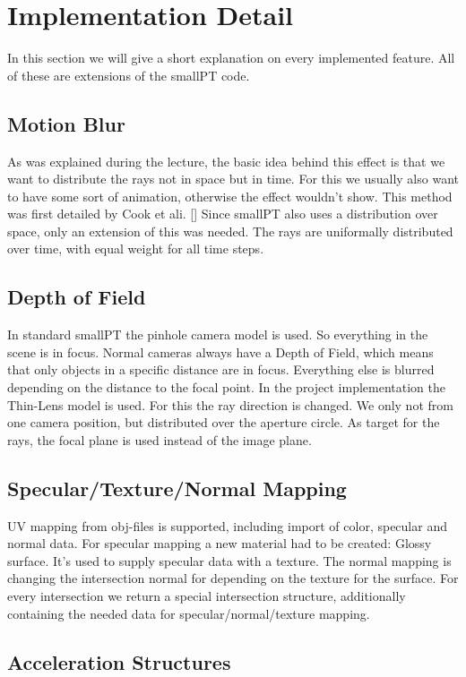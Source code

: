 \documentclass[11pt,a4paper]{article}
\begin{document}
\section{Implementation Detail}
In this section we will give a short explanation on every implemented feature. All of these are extensions of the smallPT code. 

\subsection{Motion Blur}
As was explained during the lecture, the basic idea behind this effect is that we want to distribute the rays not in space but in time. For this we usually also want to have some sort of animation, otherwise the effect wouldn't show. This method was first detailed by Cook et ali. [] 
Since smallPT also uses a distribution over space, only an extension of this was needed.
The rays are uniformally distributed over time, with equal weight for all time steps. 

\subsection{Depth of Field}
In standard smallPT the pinhole camera model is used. So everything in the scene is in focus. Normal cameras always have a Depth of Field, which means that only objects in a specific distance are in focus. Everything else is blurred depending on the distance to the focal point. In the project implementation the Thin-Lens model is used. For this the ray direction is changed. We only not from one camera position, but distributed over the aperture circle. As target for the rays, the focal plane is used instead of the image plane. 


\subsection{Specular/Texture/Normal Mapping}

UV mapping from obj-files is supported, including import of color, specular and normal data.
For specular mapping a new material had to be created: Glossy surface. It's used to supply specular data with a texture. The normal mapping is changing the intersection normal for depending on the texture for the surface. 
For every intersection we return a special intersection structure, additionally containing the needed data for specular/normal/texture mapping. 

\subsection{Acceleration Structures}
\end{document}
